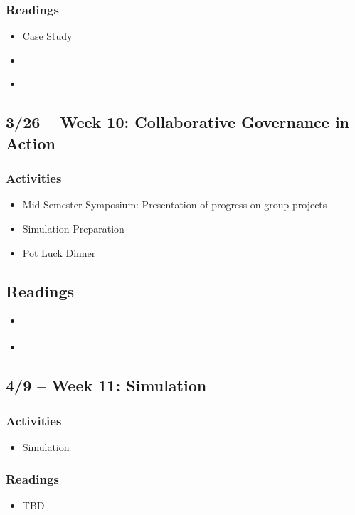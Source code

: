 \documentclass[12pt, letterpaper]{article}
\begin{document}
    \subsubsection*{Readings}
        \begin{itemize}
            \item Case Study
            \item \citet[chapter 4--5]{Agranoff2012}
            \item \citet[chapter 4--6]{Henderson2015}
        \end{itemize}

\subsection*{3/26 -- Week 10: Collaborative Governance in Action}
    \subsubsection*{Activities}
        \begin{itemize}
            \item Mid-Semester Symposium: Presentation of progress on group projects
            \item Simulation Preparation
            \item Pot Luck Dinner
        \end{itemize}
    \subsection*{Readings}
        \begin{itemize}
            \item \citet[chapter 5]{Agranoff2023}
            \item \citet[chapter 7]{Henderson2015}
        \end{itemize}


\subsection*{4/9 -- Week 11: Simulation}
    \subsubsection*{Activities}
        \begin{itemize}
            \item Simulation
        \end{itemize}
    \subsubsection*{Readings}
        \begin{itemize}
            \item TBD
        \end{itemize}
\end{document}
